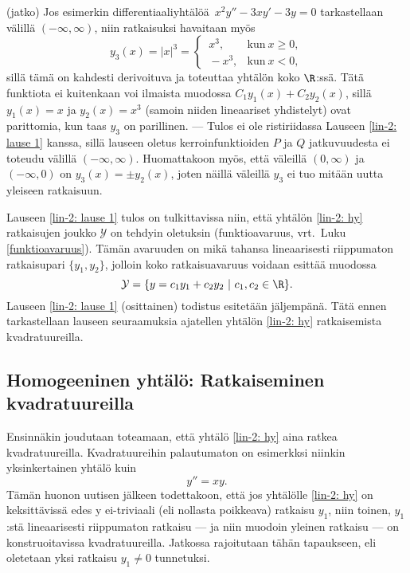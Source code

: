 \jatko \begin{Exa} (jatko) Jos esimerkin differentiaaliyhtälöä $\,x^2y''-3xy'-3y=0$
tarkastellaan välillä $(-\infty,\infty)$, niin ratkaisuksi havaitaan myös
\[
y_3(x) = |x|^3 = \begin{cases} 
                 \,x^3, &\text{kun}\ x \ge 0, \\ \,-x^3, &\text{kun}\ x<0,
                 \end{cases}
\]
sillä tämä on kahdesti derivoituva ja toteuttaa yhtälön koko $\R$:ssä. Tätä funktiota ei
kuitenkaan voi ilmaista muodossa $C_1y_1(x)+C_2y_2(x)$, sillä $y_1(x)=x$ ja $y_2(x)=x^3$
(samoin niiden lineaariset yhdistelyt) ovat parittomia, kun taas $y_3$ on parillinen. --- Tulos
ei ole ristiriidassa Lauseen \ref{lin-2: lause 1} kanssa, sillä lauseen oletus
kerroinfunktioiden $P$ ja $Q$ jatkuvuudesta ei toteudu välillä $(-\infty,\infty)$. Huomattakoon
myös, että väleillä $(0,\infty)$ ja $(-\infty,0)$ on $y_3(x)=\pm y_2(x)$, joten näillä
väleillä $y_3$ ei tuo mitään uutta yleiseen ratkaisuun. \loppu
\end{Exa}
Lauseen \ref{lin-2: lause 1} tulos on tulkittavissa niin, että yhtälön \eqref{lin-2: hy}
ratkaisujen joukko $\mathcal{Y}$ on tehdyin oletuksin  
(funktioavaruus, vrt.\ Luku \ref{funktioavaruus}). Tämän avaruuden  on mikä tahansa
lineaarisesti riippumaton ratkaisupari $\{y_1,y_2\}$, jolloin koko ratkaisuavaruus voidaan
esittää muodossa
\[
\mathcal{Y}=\{y=c_1y_1+c_2y_2 \ | \ c_1,c_2\in\R\}.
\]
Lauseen \ref{lin-2: lause 1} (osittainen) todistus esitetään jäljempänä. Tätä ennen 
tarkastellaan lauseen seuraamuksia ajatellen yhtälön \eqref{lin-2: hy} ratkaisemista
kvadratuureilla.

\subsection{Homogeeninen yhtälö: Ratkaiseminen kvadratuureilla}

Ensinnäkin joudutaan toteamaan, että yhtälö \eqref{lin-2: hy}  aina ratkea
kvadratuureilla. Kvadratuureihin palautumaton on esimerkksi niinkin yksinkertainen yhtälö kuin
\[
y''=xy.
\]
Tämän huonon uutisen jälkeen todettakoon, että jos yhtälölle \eqref{lin-2: hy} on 
keksittävissä edes y ei-triviaali (eli nollasta poikkeava) ratkaisu $y_1$, niin toinen, 
$y_1$:stä lineaarisesti riippumaton ratkaisu --- ja niin muodoin yleinen ratkaisu --- on
konstruoitavissa kvadratuureilla. Jatkossa rajoitutaan tähän tapaukseen, eli oletetaan yksi
ratkaisu $y_1 \neq 0$ tunnetuksi.

